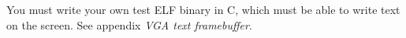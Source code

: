 {\begin{itemize}
\begin{enumerate}
  \end{enumerate}

You must write your own test ELF binary in C, which must be able to
write text on the screen. See appendix \emph{VGA text framebuffer}.

\end{itemize}


%
%
%

%
%
%
%

%
%
%
%

%
%
%
%

%
%



%
%
%

}
